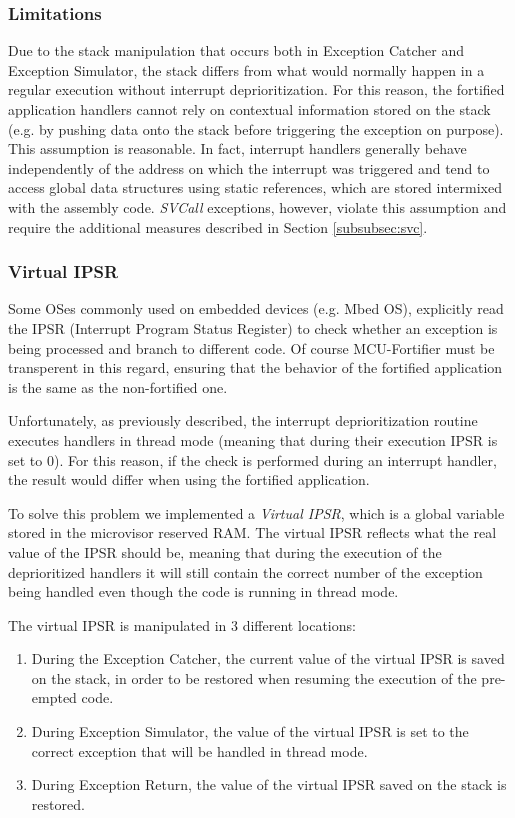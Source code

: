 \documentclass{article}
\begin{document}
\subsubsection{Limitations}
\label{subsubsec:limitations}
Due to the stack manipulation that occurs both in Exception Catcher and Exception Simulator, the stack differs from what would normally happen in a regular execution without interrupt deprioritization. For this reason, the fortified application handlers cannot rely on contextual information stored on the stack (e.g. by pushing data onto the stack before triggering the exception on purpose). This assumption is reasonable. In fact, interrupt handlers generally behave independently of the address on which the interrupt was triggered and tend to access global data structures using static references, which are stored intermixed with the assembly code. \textit{SVCall} exceptions, however, violate this assumption and require the additional measures described in Section \ref{subsubsec:svc}.

\subsubsection{Virtual IPSR}
\label{subsubsec:virtual_IPSR}
Some OSes commonly used on embedded devices (e.g. Mbed OS), explicitly read the IPSR (Interrupt Program Status Register) to check whether an exception is being processed and branch to different code. Of course MCU-Fortifier must be transperent in this regard, ensuring that the behavior of the fortified application is the same as the non-fortified one.

Unfortunately, as previously described, the interrupt deprioritization routine executes handlers in thread mode (meaning that during their execution IPSR is set to 0). For this reason, if the check is performed during an interrupt handler, the result would differ when using the fortified application.

To solve this problem we implemented a \textit{Virtual IPSR}, which is a global variable stored in the microvisor reserved RAM. The virtual IPSR reflects what the real value of the IPSR should be, meaning that during the execution of the deprioritized handlers it will still contain the correct number of the exception being handled even though the code is running in thread mode.

The virtual IPSR is manipulated in 3 different locations:
\begin{enumerate}
	\item During the Exception Catcher, the current value of the virtual IPSR is saved on the stack, in order to be restored when resuming the execution of the pre-empted code.
	\item During Exception Simulator, the value of the virtual IPSR is set to the correct exception that will be handled in thread mode.
	\item During Exception Return, the value of the virtual IPSR saved on the stack is restored.
\end{enumerate}
\end{document}
